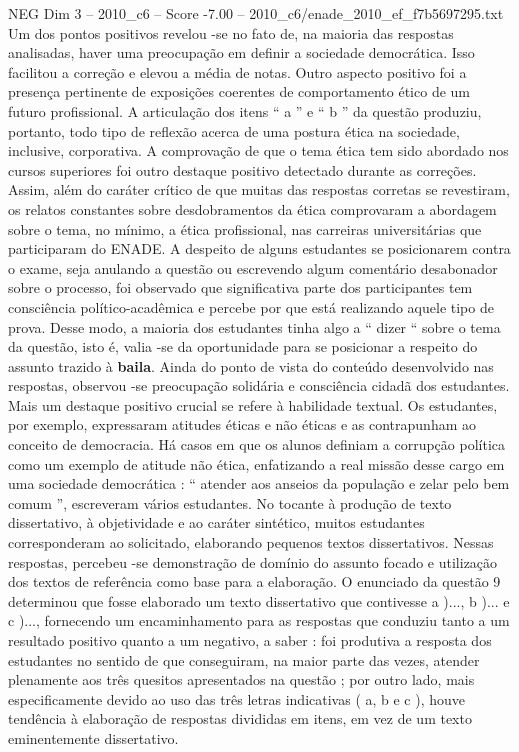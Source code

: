 \begin{textsample}{NEG Dim 3 – 2010\_c6 – Score -7.00 – 2010\_c6/enade\_2010\_ef\_f7b5697295.txt}
Um dos pontos positivos revelou -se no fato de, na maioria das respostas analisadas, haver uma preocupação em definir a sociedade democrática.
Isso facilitou a correção e elevou a média de notas.
Outro aspecto positivo foi a presença pertinente de exposições coerentes de comportamento ético de um futuro profissional.
A articulação dos itens “ a ” e “ b ” da questão produziu, portanto, todo tipo de reflexão acerca de uma postura ética na sociedade, inclusive, corporativa.
A comprovação de que o tema ética tem sido abordado nos cursos superiores foi outro destaque positivo detectado durante as correções.
Assim, além do caráter crítico de que muitas das respostas corretas se revestiram, os relatos constantes sobre desdobramentos da ética comprovaram a abordagem sobre o tema, no mínimo, a ética profissional, nas carreiras universitárias que participaram do ENADE.
A despeito de alguns estudantes se posicionarem contra o exame, seja anulando a questão ou escrevendo algum comentário desabonador sobre o processo, foi observado que significativa parte dos participantes tem consciência político-acadêmica e percebe por que está realizando aquele tipo de prova.
Desse modo, a maioria dos estudantes tinha algo a “ dizer “ sobre o tema da questão, isto é, valia -se da oportunidade para se posicionar a respeito do assunto trazido à \textbf{baila}.
Ainda do ponto de vista do conteúdo desenvolvido nas respostas, observou -se preocupação solidária e consciência cidadã dos estudantes.
Mais um destaque positivo crucial se refere à habilidade textual.
Os estudantes, por exemplo, expressaram atitudes éticas e não éticas e as contrapunham ao conceito de democracia.
Há casos em que os alunos definiam a corrupção política como um exemplo de atitude não ética, enfatizando a real missão desse cargo em uma sociedade democrática : “ atender aos anseios da população e zelar pelo bem comum ”, escreveram vários estudantes.
No tocante à produção de texto dissertativo, à objetividade e ao caráter sintético, muitos estudantes corresponderam ao solicitado, elaborando pequenos textos dissertativos.
Nessas respostas, percebeu -se demonstração de domínio do assunto focado e utilização dos textos de referência como base para a elaboração.
O enunciado da questão 9 determinou que fosse elaborado um texto dissertativo que contivesse a )..., b )... e c )..., fornecendo um encaminhamento para as respostas que conduziu tanto a um resultado positivo quanto a um negativo, a saber : foi produtiva a resposta dos estudantes no sentido de que conseguiram, na maior parte das vezes, atender plenamente aos três quesitos apresentados na questão ; por outro lado, mais especificamente devido ao uso das três letras indicativas ( a, b e c ), houve tendência à elaboração de respostas divididas em itens, em vez de um texto eminentemente dissertativo.

\end{textsample}

